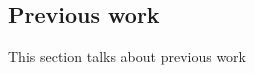 \documentclass[../../sections/introduction.tex]{subfiles}
\begin{document}
\subsection{Previous work}
    This section talks about previous work
\end{document}
